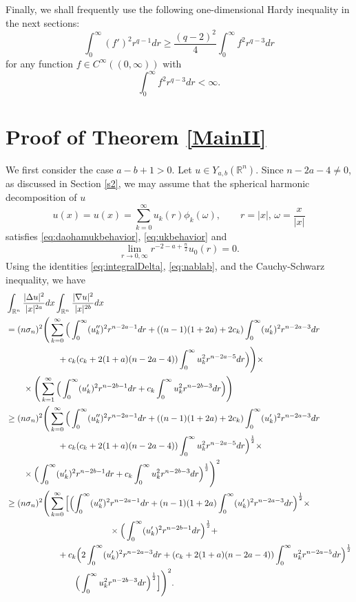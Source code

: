 \documentclass[a4paper,12pt]{article}
\theoremstyle{plain}
\theoremstyle{definition}
\theoremstyle{remark}
\def\R{\mathbb R}%
\def\irn{\int_{\R^n}}
\numberwithin{equation}{section}
\begin{document}
Finally, we shall frequently use the following one-dimensional Hardy inequality in the next sections: 
\begin{equation}\label{eq:1DHardy}
\int_0^\infty (f')^2 r^{q-1} dr \geq \frac{(q-2)^2}4 \int_0^\infty f^2 r^{q-3} dr
\end{equation}
for any function $f\in C^\infty((0,\infty))$ with 
\[
\int_0^\infty f^2 r^{q-3} dr < \infty.
\]

\section{Proof of Theorem \ref{MainII}}\label{s3}

We first consider the case $a -b + 1 > 0$. Let $u\in Y_{a,b}(\R^n)$. Since $n-2a -4 \not=0$, as discussed in Section \ref{s2}, we may assume that the spherical harmonic decomposition of $u$
\[
u(x) = u(x) = \sum_{k=0}^\infty u_k(r) \phi_k(\omega),\qquad r = |x|, \,\omega = \frac x{|x|}
\]
satisfies \eqref{eq:daohamukbehavior}, \eqref{eq:ukbehavior} and
\[
\lim_{r \to 0, \infty} r^{-2 -a +\frac n2} u_0(r) = 0.
\]
Using the identities \eqref{eq:integralDelta},  \eqref{eq:nablab}, and the Cauchy-Schwarz inequality, we have
\begin{align}\label{eq:C3abdecomp}
&\irn \frac{|\Delta u|^2}{|x|^{2a}} dx \irn \frac{|\nabla u|^2}{|x|^{2b}} dx\notag\\
& =(n\sigma_n)^2\Bigg(\sum_{k=0}^\infty \Big(\int_0^\infty (u_k'')^2r^{n-2a -1} dr+ ((n-1)(1+2a) +2c_k) \int_0^\infty (u_k')^2 r^{n-2a -3} dr\notag\\
&\qquad\qquad\qquad + c_k(c_k + 2(1+a)(n-2a -4))\int_0^\infty u_k^2 r^{n -2a -5} dr\Big)\Bigg) \times \notag\\
&\qquad \times \Bigg(\sum_{k=1}^\infty\Big(\int_0^\infty (u_k')^2 r^{n-2b -1} dr + c_k \int_0^\infty u_k^2 r^{n -2b -3} dr\Big)\Bigg)\notag\\
&\geq (n\sigma_n)^2 \Bigg(\sum_{k=0}^\infty\Big(\int_0^\infty (u_k'')^2r^{n-2a -1} dr+ ((n-1)(1+2a) +2c_k) \int_0^\infty (u_k')^2 r^{n-2a -3} dr\notag\\
&\qquad\qquad\qquad + c_k(c_k + 2(1+a)(n-2a -4))\int_0^\infty u_k^2 r^{n -2a -5} dr\Big)^{\frac12} \times \notag\\
&\qquad \times \Big(\int_0^\infty (u_k')^2 r^{n-2b -1} dr + c_k \int_0^\infty u_k^2 r^{n -2b -3} dr\Big)^{\frac12}\Bigg)^2\notag\\
&\geq (n\sigma_n)^2\Bigg(\sum_{k=0}^\infty\Big[\Bigl(\int_0^\infty (u_k'')^2r^{n-2a -1} dr+ (n-1)(1+2a) \int_0^\infty (u_k')^2 r^{n-2a -3} dr\Big)^{\frac12} \times\notag\\ 
&\qquad\qquad\qquad\qquad\qquad\qquad \times \Big(\int_0^\infty (u_k')^2 r^{n-2b -1} dr\Big)^{\frac12} + \notag\\
&\qquad \qquad \qquad + c_k\Big(2 \int_0^\infty (u_k')^2 r^{n-2a -3} dr+(c_k + 2(1+a)(n-2a -4))\int_0^\infty u_k^2 r^{n -2a -5} dr\Big)^{\frac12}\notag\\
&\qquad\qquad \qquad\qquad \Big(\int_0^\infty u_k^2 r^{n -2b -3} dr\Big)^{\frac12}\Bigl]\Bigg)^2.
\end{align}
\end{document}
